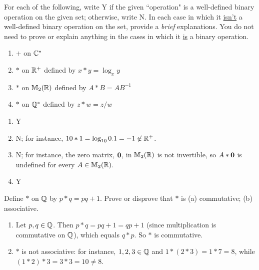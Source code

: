 \begin{exercise}[ID=2B]
For each of the following, write Y if the given ``operation" is a well-defined binary operation on the given set; otherwise, write N. In each case in which it \underline{isn't} a well-defined binary operation on the set, provide a \textit{brief} explanations. You do not need to prove or explain anything in the cases in which it \underline{is} a binary operation.

\begin{enumerate}
\item $+$ on $\mathbb{C}^*$
\item $*$ on $\mathbb{R}^+$ defined by $x*y=\log_x y$
\item $*$ on $\mathbb{M}_2(\mathbb{R})$ defined by $A*B=AB^{-1}$
\item $*$ on $\mathbb{Q}^*$ defined by $z*w=z/w$
\end{enumerate}

\end{exercise}

\begin{solution}[print=true]
\begin{enumerate}
\item Y
\item N; for instance, $10*1=\log_{10}0.1=-1\not\in\mathbb{R}^+$.
\item N; for instance, the zero matrix, $\mathbf 0$, in $\mathbb{M}_2(\mathbb{R})$ is not invertible, so $A*\mathbf 0$ is undefined for every $A\in\mathbb{M}_2(\mathbb{R})$.
\item Y

\end{enumerate}
\end{solution}


\begin{exercise}[ID=2D]
Define $*$ on $\mathbb{Q}$ by $p*q=pq+1$. Prove or disprove that $*$ is (a) commutative; (b) associative.
\end{exercise}

\begin{solution}[print=true]
\begin{enumerate}
\item Let $p,q\in \mathbb{Q}$.  Then $p*q=pq+1=qp+1$ (since multiplication is commutative on $\mathbb{Q}$), which equals $q*p$.  So $*$ is commutative.
\item  $*$ is not associative: for instance, $1,2,3\in \mathbb{Q}$ and $1*(2*3)=1*7=8$, while $(1*2)*3=3*3=10\neq 8$.
\end{enumerate}
\end{solution}

